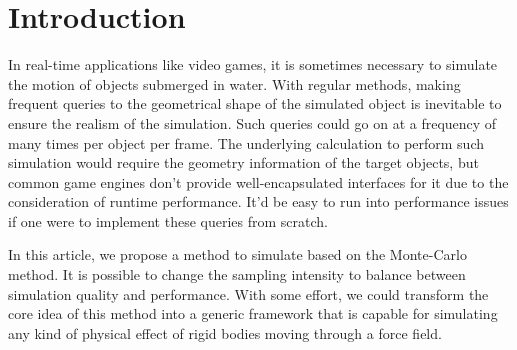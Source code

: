 \section{Introduction}

In real-time applications like video games, it is sometimes necessary to simulate the motion of objects submerged in water.
With regular methods, making frequent queries to the geometrical shape of the simulated object is inevitable to ensure the realism of the simulation.
Such queries could go on at a frequency of many times per object per frame.
The underlying calculation to perform such simulation would require the geometry information of the target objects, but common game engines don't provide well-encapsulated interfaces for it due to the consideration of runtime performance.
It'd be easy to run into performance issues if one were to implement these queries from scratch.

In this article, we propose a method to simulate based on the Monte-Carlo method.
It is possible to change the sampling intensity to balance between simulation quality and performance.
With some effort, we could transform the core idea of this method into a generic framework that is capable for simulating any kind of physical effect of rigid bodies moving through a force field.